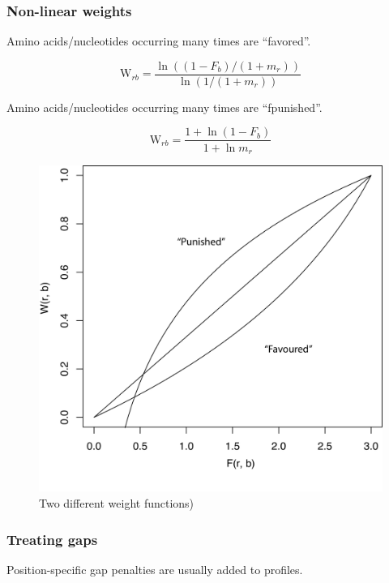 %
%
\subsubsection*{Non-linear weights}
Amino acids/nucleotides occurring many times are ``favored''.

\[
\mathrm{W}_{rb} = \dfrac{ \ln((1-F_b)/(1+m_r)) }{ \ln(1/(1+m_r)) }
\]

\bigskip 

\noindent
Amino acids/nucleotides occurring many times are ``fpunished''.

\[
\mathrm{W}_{rb} = \dfrac{ 1 + \ln(1-F_b) }{ 1 + \ln m_r }
\]

\bigskip 

\begin{figure}[H]
  \centering
      \includegraphics[width=0.3 \textwidth]{fig12/weight_functions.png}
  \caption{Two different weight functions)}
\end{figure}

%
%
\subsubsection*{Treating gaps}
Position-specific gap penalties are usually added to profiles.

\bigskip 

%
